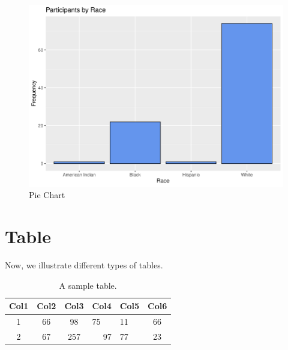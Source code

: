 \documentclass[11pt]{article}
\begin{document}
\begin{figure}[H]
\centering
\includegraphics[scale=0.8]{R-Plot.pdf}
\caption{Pie Chart}
\label{fig:pie}
\end{figure}

\section{Table}
\label{ref:table}
Now, we illustrate different types of tables.

\begin{table}[!htb]
\centering
\caption{A sample table.}
\begin{tabular}{|c|c|c|m{4cm}|l|c|} %

\hline
Col1 & \textbf{Col2} & Col3 & \multicolumn{1}{c|}{Col4} & Col5 & Col6 \\
\hline
1 & 66 & 98 & 75 & 11 & 66 \\
\hline
2 & 67 & 257 & \multicolumn{1}{r|}{97} & 77 & 23 \\
\hline
\end{tabular}
\end{table}
\end{document}
